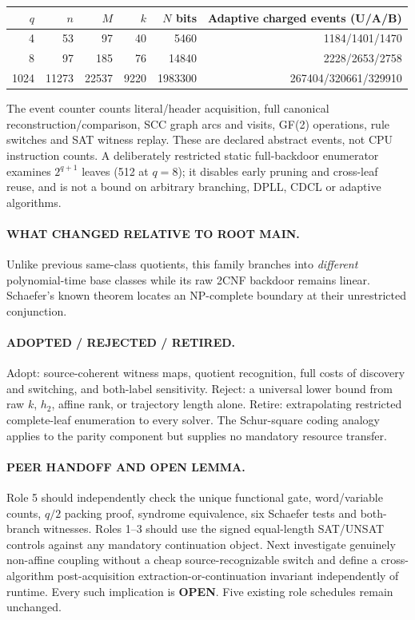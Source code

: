 \documentclass[11pt]{article}
\begin{document}
\begin{center}\small
\begin{tabular}{@{}rrrrrr@{}}\toprule
$q$ & $n$ & $M$ & $k$ & $N$ bits & Adaptive charged events (U/A/B)\\\midrule
4&53&97&40&5460&1184/1401/1470\\
8&97&185&76&14840&2228/2653/2758\\
1024&11273&22537&9220&1983300&267404/320661/329910\\\bottomrule
\end{tabular}
\end{center}
The event counter counts literal/header acquisition, full
canonical reconstruction/comparison, SCC graph arcs and visits,
GF(2) operations, rule switches and SAT witness replay.
These are declared abstract events, not CPU instruction counts.
A deliberately restricted static full-backdoor enumerator
examines $2^{q+1}$ leaves (512 at $q=8$);
it disables early pruning and cross-leaf reuse, and is not a
bound on arbitrary branching, DPLL, CDCL or adaptive algorithms.

\paragraph{WHAT CHANGED RELATIVE TO ROOT MAIN.}
Unlike previous same-class quotients, this family branches
into \emph{different} polynomial-time base classes while its
raw 2CNF backdoor remains linear. Schaefer's known theorem locates
an NP-complete boundary at their unrestricted conjunction.
\paragraph{ADOPTED / REJECTED / RETIRED.}
Adopt: source-coherent witness maps, quotient recognition,
full costs of discovery and switching, and both-label sensitivity.
Reject: a universal lower bound from raw $k$, $h_2$,
affine rank, or trajectory length alone. Retire:
extrapolating restricted complete-leaf enumeration to every solver.
The Schur-square coding analogy applies to the parity component
but supplies no mandatory resource transfer.
\paragraph{PEER HANDOFF AND OPEN LEMMA.}
Role 5 should independently check the unique functional gate,
word/variable counts, $q/2$ packing proof, syndrome equivalence,
six Schaefer tests and both-branch witnesses.
Roles 1--3 should use the signed equal-length SAT/UNSAT controls
against any mandatory continuation object.
Next investigate genuinely non-affine coupling without a
cheap source-recognizable switch and define a cross-algorithm
post-acquisition extraction-or-continuation invariant
independently of runtime. Every such implication is \textbf{OPEN}.
Five existing role schedules remain unchanged.
\end{document}
